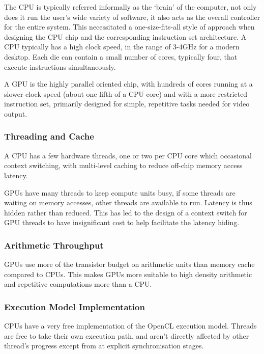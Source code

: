 The CPU is typically referred informally as the `brain' of the computer, not
only does it run the user's wide variety of software, it also acts as the
overall controller for the entire system. This necessitated a one-size-fits-all
style of approach when designing the CPU chip and the corresponding instruction
set architecture. A CPU typically has a high clock speed, in the range of 3-4GHz
for a modern desktop. Each die can contain a small number of cores, typically
four, that execute instructions simultaneously.

A GPU is the highly parallel oriented chip, with hundreds of cores running at a
slower clock speed (about one fifth of a CPU core) and with a more restricted
instruction set, primarily designed for simple, repetitive tasks needed for
video output.

\subsubsection{Threading and Cache}

A CPU has a few hardware threads, one or two per CPU core which occasional
context switching, with multi-level caching to reduce off-chip memory access
latency.

GPUs have many threads to keep compute units busy, if some threads are waiting
on memory accesses, other threads are available to run. Latency is thus hidden
rather than reduced. This has led to the design of a context switch for GPU
threads to have insignificant cost to help facilitate the latency hiding.

\subsubsection{Arithmetic Throughput}

GPUs use more of the transistor budget on arithmetic units than memory cache
compared to CPUs. This makes GPUs more suitable to high density arithmetic and
repetitive computations more than a CPU.

\subsubsection{Execution Model Implementation}

CPUs have a very free implementation of the OpenCL execution model. Threads are
free to take their own execution path, and aren't directly affected by other
thread's progress except from at explicit synchronisation stages.

